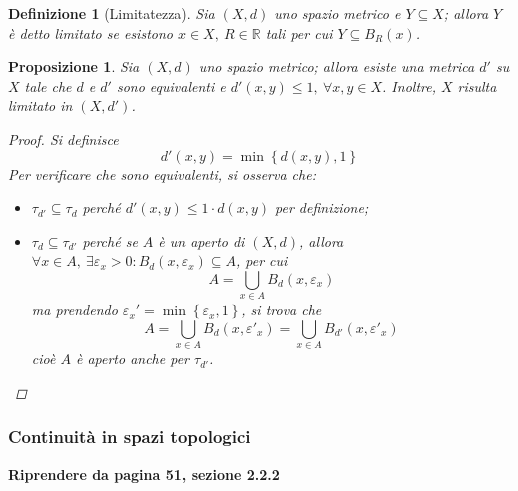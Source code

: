 \documentclass[12pt]{scrartcl}
\theoremstyle{style}
\newtheorem{definizione}{Definizione}[section]
\newtheorem{prop}{Proposizione}[section]
\numberwithin{equation}{subsection}
\renewcommand{\textbf}[1]{\textsf{\bfseries #1}}
\begin{document}
\begin{definizione}
	[Limitatezza]
	Sia $(X,d)$ uno spazio metrico e $Y \subseteq X$; allora $Y$ \`e detto \textit{limitato} se esistono $x \in X, \ R \in \mathbb{R}$ tali per cui $Y \subseteq B_R(x)$.
\end{definizione}
\begin{prop}
	Sia $(X,d)$ uno spazio metrico; allora esiste una metrica $d'$ su $X$ tale che $d$ e $d'$ sono equivalenti e $d'(x,y)\le 1, \ \forall x,y \in X$.
	Inoltre, $X$ risulta limitato in $(X,d')$.
	\begin{proof}
		Si definisce 
		\[
		d'(x,y) = \min\left\{ d(x,y) , 1 \right\} 
		\] 
		Per verificare che sono equivalenti, si osserva che:
		\begin{itemize}
			\item $\tau _{d'} \subseteq \tau _d$ perch\'e $d'(x,y) \le 1 \cdot d(x,y)$ per definizione;
			\item $\tau _{d} \subseteq \tau _{d'} $ perch\'e se $A$ \`e un aperto di $(X,d)$, allora $\forall x \in A, \ \exists \varepsilon _x > 0 : B_d(x,\varepsilon _x) \subseteq A$, per cui
				\[
				A = \bigcup _{x \in A} B_d(x,\varepsilon _x)
				\] 
				ma prendendo $\varepsilon _x ' = \min \left\{ \varepsilon _x , 1 \right\} $, si trova che
				\[
				A = \bigcup _{x \in A}  B_d (x,\varepsilon '_x) = \bigcup _{x \in A} B_{d'} (x,\varepsilon '_x)
				\] 
				cio\`e $A$ \`e aperto anche per $\tau _{d'} $.
		\end{itemize}
	\end{proof}
\end{prop}
\subsubsection{Continuit\`a in spazi topologici}
\begin{center}
	\textbf{Riprendere da pagina 51, sezione 2.2.2} 
\end{center}
\end{document}
